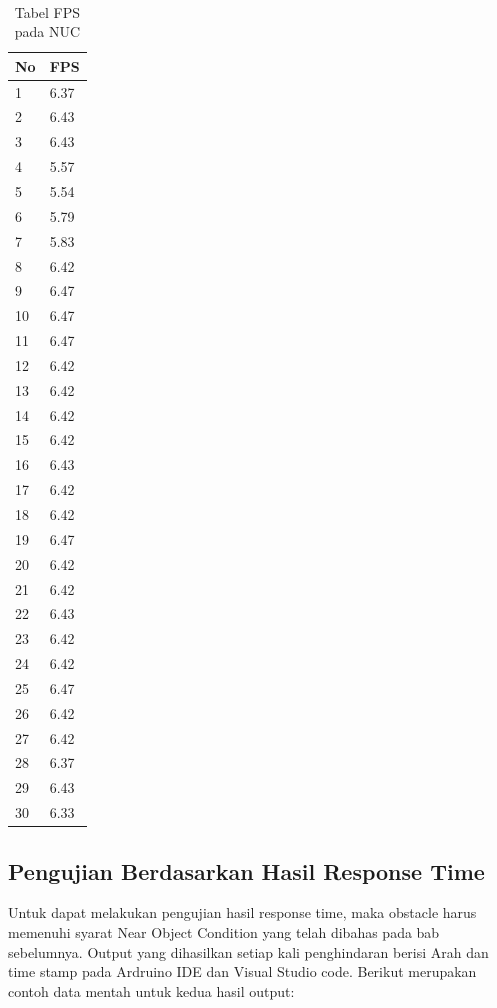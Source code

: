 \begin{table}[H]
    \centering
    \caption{Tabel FPS pada NUC}
    \label{tb:TabelFPS}                                        \\
    \begin{tabular}{|l|l|}
    \hline
        No & FPS \\ \hline
        1 & 6.37 \\ \hline
        2 & 6.43 \\ \hline
        3 & 6.43 \\ \hline
        4 & 5.57 \\ \hline
        5 & 5.54 \\ \hline
        6 & 5.79 \\ \hline
        7 & 5.83 \\ \hline
        8 & 6.42 \\ \hline
        9 & 6.47 \\ \hline
        10 & 6.47 \\ \hline
        11 & 6.47 \\ \hline
        12 & 6.42 \\ \hline
        13 & 6.42 \\ \hline
        14 & 6.42 \\ \hline
        15 & 6.42 \\ \hline
        16 & 6.43 \\ \hline
        17 & 6.42 \\ \hline
        18 & 6.42 \\ \hline
        19 & 6.47 \\ \hline
        20 & 6.42 \\ \hline
        21 & 6.42 \\ \hline
        22 & 6.43 \\ \hline
        23 & 6.42 \\ \hline
        24 & 6.42 \\ \hline
        25 & 6.47 \\ \hline
        26 & 6.42 \\ \hline
        27 & 6.42 \\ \hline
        28 & 6.37 \\ \hline
        29 & 6.43 \\ \hline
        30 & 6.33 \\ \hline
    \end{tabular}
\end{table}
 
\subsection{Pengujian Berdasarkan Hasil Response Time}
Untuk dapat melakukan pengujian hasil response time, maka obstacle harus memenuhi syarat Near Object Condition yang telah dibahas pada bab sebelumnya. Output yang dihasilkan setiap kali penghindaran berisi Arah dan time stamp pada Ardruino IDE dan Visual Studio code. Berikut merupakan contoh data mentah untuk kedua hasil output: 

